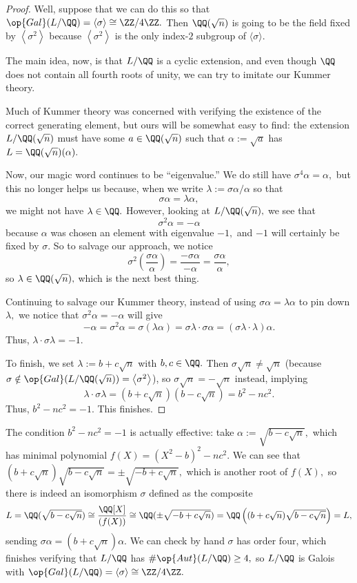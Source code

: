 \begin{proof}
	Well, suppose that we can do this so that $\op{Gal}(L/\QQ)=\langle\sigma\rangle\cong\ZZ/4\ZZ.$ Then $\QQ(\sqrt n)$ is going to be the field fixed by $\left\langle\sigma^2\right\rangle$ because $\left\langle\sigma^2\right\rangle$ is the only index-$2$ subgroup of $\langle\sigma\rangle.$

	The main idea, now, is that $L/\QQ$ is a cyclic extension, and even though $\QQ$ does not contain all fourth roots of unity, we can try to imitate our Kummer theory.

	Much of Kummer theory was concerned with verifying the existence of the correct generating element, but ours will be somewhat easy to find: the extension $L/\QQ(\sqrt n)$ must have some $a\in\QQ(\sqrt n)$ such that $\alpha:=\sqrt a$ has $L=\QQ(\sqrt n)(\alpha).$
	
	Now, our magic word continues to be ``eigenvalue.'' We do still have $\sigma^4\alpha=\alpha,$ but this no longer helps us because, when we write $\lambda:=\sigma\alpha/\alpha$ so that
	\[\sigma\alpha=\lambda\alpha,\]
	we might not have $\lambda\in\QQ.$ However, looking at $L/\QQ(\sqrt n),$ we see that
	\[\sigma^2\alpha=-\alpha\]
	because $\alpha$ was chosen an element with eigenvalue $-1,$ and $-1$ will certainly be fixed by $\sigma.$ So to salvage our approach, we notice
	\[\sigma^2\left(\frac{\sigma\alpha}\alpha\right)=\frac{-\sigma\alpha}{-\alpha}=\frac{\sigma\alpha}\alpha,\]
	so $\lambda\in\QQ(\sqrt n),$ which is the next best thing.
	
	Continuing to salvage our Kummer theory, instead of using $\sigma\alpha=\lambda\alpha$ to pin down $\lambda,$ we notice that $\sigma^2\alpha=-\alpha$ will give
	\[-\alpha=\sigma^2\alpha=\sigma(\lambda\alpha)=\sigma\lambda\cdot\sigma\alpha=(\sigma\lambda\cdot\lambda)\alpha.\]
	Thus, $\lambda\cdot\sigma\lambda=-1.$

	To finish, we set $\lambda:=b+c\sqrt n$ with $b,c\in\QQ.$ Then $\sigma\sqrt n\ne\sqrt n$ (because $\sigma\notin\op{Gal}(L/\QQ(\sqrt n))=\left\langle\sigma^2\right\rangle$), so $\sigma\sqrt n=-\sqrt n$ instead, implying
	\[\lambda\cdot\sigma\lambda=\left(b+c\sqrt n\right)\left(b-c\sqrt n\right)=b^2-nc^2.\]
	Thus, $b^2-nc^2=-1.$ This finishes.
\end{proof}
\begin{remark}[Nir]
	The condition $b^2-nc^2=-1$ is actually effective: take $\alpha:=\sqrt{b-c\sqrt n},$ which has minimal polynomial $f(X)=\left(X^2-b\right)^2-nc^2.$ We can see that $\left(b+c\sqrt n\right)\sqrt{b-c\sqrt n}=\pm\sqrt{-b+c\sqrt n},$ which is another root of $f(X),$ so there is indeed an isomorphism $\sigma$ defined as the composite
	\[L=\QQ({\textstyle\sqrt{b-c\sqrt n}})\cong\frac{\QQ[X]}{(f(X))}\cong\QQ(\pm\textstyle\sqrt{-b+c\sqrt n})=\QQ\left((b+c\sqrt n)\textstyle\sqrt{b-c\sqrt n}\right)=L,\]
	sending $\sigma\alpha=(b+c\sqrt n)\alpha.$ We can check by hand $\sigma$ has order four, which finishes verifying that $L/\QQ$ has $\#\op{Aut}(L/\QQ)\ge4,$ so $L/\QQ$ is Galois with $\op{Gal}(L/\QQ)=\langle\sigma\rangle\cong\ZZ/4\ZZ.$
\end{remark}
